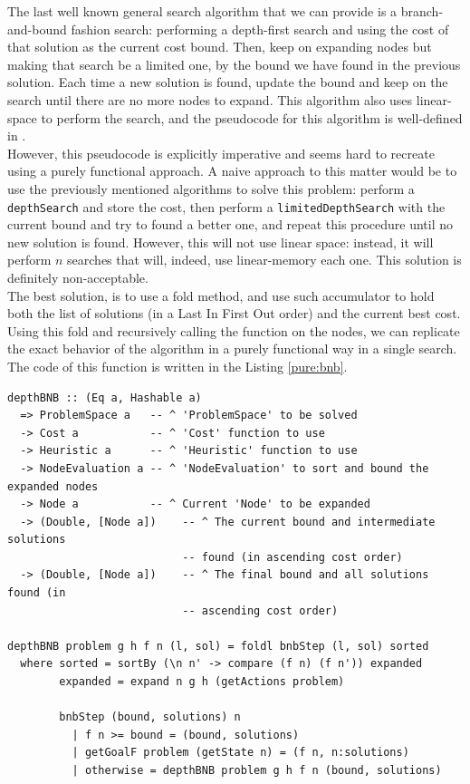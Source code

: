 The last well known general search algorithm that we can provide is a
branch-and-bound fashion search: performing a depth-first search and using the
cost of that solution as the current cost bound. Then, keep on expanding nodes
but making that search be a limited one, by the bound we have found in the
previous solution. Each time a new solution is found, update the bound and keep
on the search until there are no more nodes to expand. This algorithm also uses
linear-space to perform the search, and the pseudocode for this algorithm is
well-defined in \cite{zhang-1995-bnb}.\\

However, this pseudocode is explicitly imperative and seems hard to recreate
using a purely functional approach. A naive approach to this matter would be to
use the previously mentioned algorithms to solve this problem: perform a
\texttt{depthSearch} and store the cost, then perform a
\texttt{limitedDepthSearch} with the current bound and try to found a better
one, and repeat this procedure until no new solution is found. However, this
will not use linear space: instead, it will perform $n$ searches that will,
indeed, use linear-memory each one. This solution is definitely
non-acceptable.\\

The best solution, is to use a fold method, and use such accumulator to hold
both the list of solutions (in a Last In First Out order) and the current best
cost. Using this fold and recursively calling the function on the nodes, we can
replicate the exact behavior of the algorithm in a purely functional way in a
single search. The code of this function is written in the Listing
\ref{pure:bnb}.\\

\begin{lstlisting}[style=haskell,
caption=Pure \texttt{depthBNB} implementation, label=pure:bnb]
depthBNB :: (Eq a, Hashable a)
  => ProblemSpace a   -- ^ 'ProblemSpace' to be solved
  -> Cost a           -- ^ 'Cost' function to use
  -> Heuristic a      -- ^ 'Heuristic' function to use
  -> NodeEvaluation a -- ^ 'NodeEvaluation' to sort and bound the expanded nodes
  -> Node a           -- ^ Current 'Node' to be expanded
  -> (Double, [Node a])    -- ^ The current bound and intermediate solutions
                           -- found (in ascending cost order)
  -> (Double, [Node a])    -- ^ The final bound and all solutions found (in
                           -- ascending cost order)

depthBNB problem g h f n (l, sol) = foldl bnbStep (l, sol) sorted
  where sorted = sortBy (\n n' -> compare (f n) (f n')) expanded
        expanded = expand n g h (getActions problem)

        bnbStep (bound, solutions) n
          | f n >= bound = (bound, solutions)
          | getGoalF problem (getState n) = (f n, n:solutions)
          | otherwise = depthBNB problem g h f n (bound, solutions)
\end{lstlisting}


\newpage

